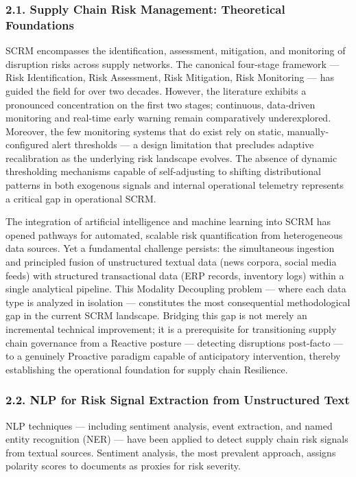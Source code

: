 \documentclass[conference]{IEEEtran}
\begin{document}
\subsubsection{2.1. Supply Chain Risk Management: Theoretical
Foundations}\label{supply-chain-risk-management-theoretical-foundations}

SCRM encompasses the identification, assessment, mitigation, and
monitoring of disruption risks across supply networks. The canonical
four-stage framework --- Risk Identification, Risk Assessment, Risk
Mitigation, Risk Monitoring --- has guided the field for over two
decades. However, the literature exhibits a pronounced concentration on
the first two stages; continuous, data-driven monitoring and real-time
early warning remain comparatively underexplored. Moreover, the few
monitoring systems that do exist rely on static, manually-configured
alert thresholds --- a design limitation that precludes adaptive
recalibration as the underlying risk landscape evolves. The absence of
dynamic thresholding mechanisms capable of self-adjusting to shifting
distributional patterns in both exogenous signals and internal
operational telemetry represents a critical gap in operational SCRM.

The integration of artificial intelligence and machine learning into
SCRM has opened pathways for automated, scalable risk quantification
from heterogeneous data sources. Yet a fundamental challenge persists:
the simultaneous ingestion and principled fusion of unstructured textual
data (news corpora, social media feeds) with structured transactional
data (ERP records, inventory logs) within a single analytical pipeline.
This Modality Decoupling problem --- where each data type is analyzed in
isolation --- constitutes the most consequential methodological gap in
the current SCRM landscape. Bridging this gap is not merely an
incremental technical improvement; it is a prerequisite for
transitioning supply chain governance from a Reactive posture ---
detecting disruptions post-facto --- to a genuinely Proactive paradigm
capable of anticipatory intervention, thereby establishing the
operational foundation for supply chain Resilience.

\subsubsection{2.2. NLP for Risk Signal Extraction from Unstructured
Text}\label{nlp-for-risk-signal-extraction-from-unstructured-text}

NLP techniques --- including sentiment analysis, event extraction, and
named entity recognition (NER) --- have been applied to detect supply
chain risk signals from textual sources. Sentiment analysis, the most
prevalent approach, assigns polarity scores to documents as proxies for
risk severity.
\end{document}
